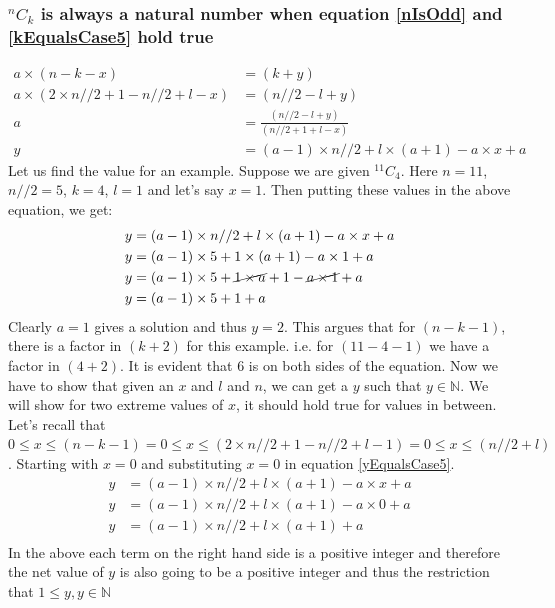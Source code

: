 \documentclass[12pt, twoside]{article}
\newcommand*{\Combination}[2]{{}^{#1}C_{#2}}%
\begin{document}
\subsubsection{$\Combination{n}{k}$ is always a natural number when equation \eqref{nIsOdd} and \eqref{kEqualsCase5} hold true}\label{ProofkEqualsCase5}
\begin{align}
	a \times (n-k-x) &= (k+y) \nonumber \\
	a \times (2\times n//2 + 1 - n//2 +l - x) &= (n//2 -l + y) \nonumber \\
	a &= \frac{(n//2 -l + y)}{(n//2 + 1 +l - x)} \nonumber \\
	y &= (a-1)\times n//2 + l\times(a+1) - a\times x + a \label{yEqualsCase5}	
\end{align}
Let us find the value for an example. Suppose we are given $\Combination{11}{4}$. Here $n=11$, $n//2=5$, $k=4$, $l=1$ and let's say $x=1$. Then putting these values in the above equation, we get:
\begin{align*}
	y &= (a-1)\times n//2 + l\times(a+1) - a\times x + a \\
	y &= (a-1)\times 5 + 1\times(a+1) - a\times 1 + a \\
	y &= (a-1)\times 5 + \cancel{1\times a}+ 1 - \cancel{a\times 1} + a \\
	y &= (a-1)\times 5 + 1 + a \\
\end{align*}
Clearly $a=1$ gives a solution and thus $y=2$. This argues that for $(n-k-1)$, there is a factor in $(k+2)$ for this example. i.e. for $(11-4-1)$ we have a factor in $(4+2)$. It is evident that $6$ is on both sides of the equation.\newline
Now we have to show that given an $x$ and $l$ and $n$, we can get a $y$ such that $y \in \mathbb{N}$. We will show for two extreme values of $x$, it should hold true for values in between.\newline
Let's recall that $0 \leq x \leq (n-k-1) = 0 \leq x \leq (2\times n//2+1-n//2+l-1) = 0 \leq x \leq (n//2 + l)$. Starting with $x=0$ and substituting $x=0$ in equation \eqref{yEqualsCase5}.
\begin{align*}
	y &= (a-1)\times n//2 + l\times(a+1) - a\times x + a \\
	y &= (a-1)\times n//2 + l\times(a+1) - a\times 0 + a \\	
	y &= (a-1)\times n//2 + l\times(a+1) + a \\		
\end{align*}
In the above each term on the right hand side is a positive integer and therefore the net value of $y$ is also going to be a positive integer and thus the restriction that $1 \leq y, y \in \mathbb{N}$\newline
\end{document}
